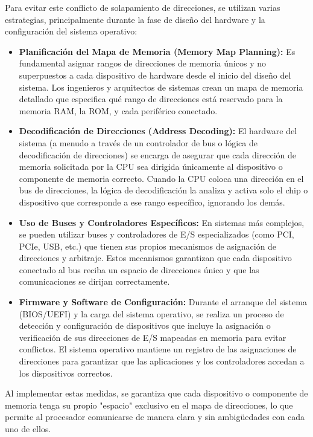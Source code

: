 \documentclass[12pt, a4paper]{article}
\begin{document}
Para evitar este conflicto de solapamiento de direcciones, se utilizan varias estrategias, principalmente durante la fase de diseño del hardware y la configuración del sistema operativo:
\begin{itemize}
    \item \textbf{Planificación del Mapa de Memoria (Memory Map Planning):} Es fundamental asignar rangos de direcciones de memoria únicos y no superpuestos a cada dispositivo de hardware desde el inicio del diseño del sistema. Los ingenieros y arquitectos de sistemas crean un mapa de memoria detallado que especifica qué rango de direcciones está reservado para la memoria RAM, la ROM, y cada periférico conectado.
    \item \textbf{Decodificación de Direcciones (Address Decoding):} El hardware del sistema (a menudo a través de un controlador de bus o lógica de decodificación de direcciones) se encarga de asegurar que cada dirección de memoria solicitada por la CPU sea dirigida únicamente al dispositivo o componente de memoria correcto. Cuando la CPU coloca una dirección en el bus de direcciones, la lógica de decodificación la analiza y activa solo el chip o dispositivo que corresponde a ese rango específico, ignorando los demás.
    \item \textbf{Uso de Buses y Controladores Específicos:} En sistemas más complejos, se pueden utilizar buses y controladores de E/S especializados (como PCI, PCIe, USB, etc.) que tienen sus propios mecanismos de asignación de direcciones y arbitraje. Estos mecanismos garantizan que cada dispositivo conectado al bus reciba un espacio de direcciones único y que las comunicaciones se dirijan correctamente.
    \item \textbf{Firmware y Software de Configuración:} Durante el arranque del sistema (BIOS/UEFI) y la carga del sistema operativo, se realiza un proceso de detección y configuración de dispositivos que incluye la asignación o verificación de sus direcciones de E/S mapeadas en memoria para evitar conflictos. El sistema operativo mantiene un registro de las asignaciones de direcciones para garantizar que las aplicaciones y los controladores accedan a los dispositivos correctos.
\end{itemize}
Al implementar estas medidas, se garantiza que cada dispositivo o componente de memoria tenga su propio "espacio" exclusivo en el mapa de direcciones, lo que permite al procesador comunicarse de manera clara y sin ambigüedades con cada uno de ellos.
\end{document}
